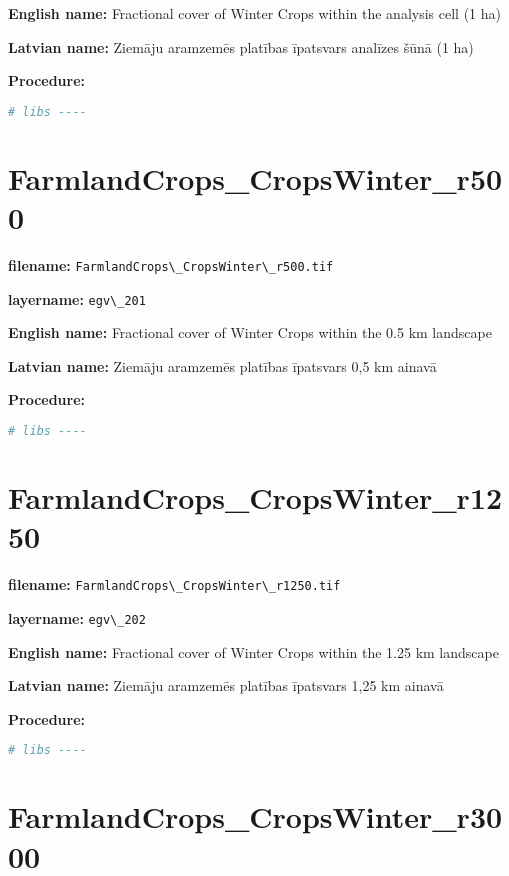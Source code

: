 \documentclass[
]{book}
\newcommand{\passthrough}[1]{#1}
\begin{document}
\textbf{English name:} Fractional cover of Winter Crops within the analysis cell (1 ha)

\textbf{Latvian name:} Ziemāju aramzemēs platības īpatsvars analīzes šūnā (1 ha)

\textbf{Procedure:}

\begin{lstlisting}[language=R]
# libs ----
\end{lstlisting}

\section{FarmlandCrops\_CropsWinter\_r500}\label{ch06.201}

\textbf{filename:} \passthrough{\lstinline!FarmlandCrops\_CropsWinter\_r500.tif!}

\textbf{layername:} \passthrough{\lstinline!egv\_201!}

\textbf{English name:} Fractional cover of Winter Crops within the 0.5 km landscape

\textbf{Latvian name:} Ziemāju aramzemēs platības īpatsvars 0,5 km ainavā

\textbf{Procedure:}

\begin{lstlisting}[language=R]
# libs ----
\end{lstlisting}

\section{FarmlandCrops\_CropsWinter\_r1250}\label{ch06.202}

\textbf{filename:} \passthrough{\lstinline!FarmlandCrops\_CropsWinter\_r1250.tif!}

\textbf{layername:} \passthrough{\lstinline!egv\_202!}

\textbf{English name:} Fractional cover of Winter Crops within the 1.25 km landscape

\textbf{Latvian name:} Ziemāju aramzemēs platības īpatsvars 1,25 km ainavā

\textbf{Procedure:}

\begin{lstlisting}[language=R]
# libs ----
\end{lstlisting}

\section{FarmlandCrops\_CropsWinter\_r3000}\label{ch06.203}
\end{document}

